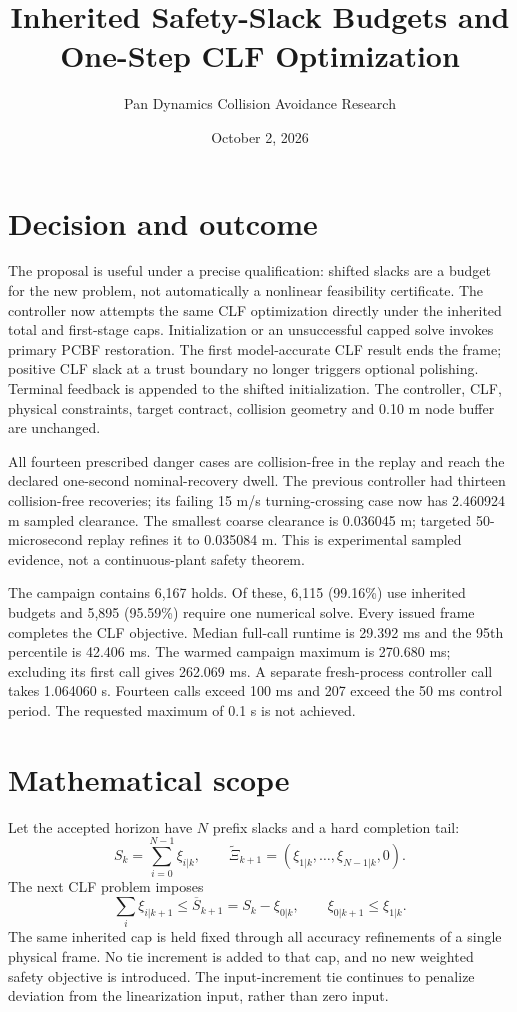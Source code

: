 \documentclass[11pt]{article}
\title{Inherited Safety-Slack Budgets and One-Step CLF Optimization}
\author{Pan Dynamics Collision Avoidance Research}
\date{October 2, 2026}
\begin{document}
\maketitle
\section{Decision and outcome}
The proposal is useful under a precise qualification: shifted slacks are a
budget for the new problem, not automatically a nonlinear feasibility
certificate. The controller now attempts the same CLF optimization directly
under the inherited total and first-stage caps. Initialization or an
unsuccessful capped solve invokes primary PCBF restoration. The first
model-accurate CLF result ends the frame; positive CLF slack at a trust boundary
no longer triggers optional polishing. Terminal feedback is appended to the
shifted initialization. The controller, CLF, physical constraints, target
contract, collision geometry and 0.10 m node buffer are unchanged.

All fourteen prescribed danger cases are collision-free in the replay and
reach the declared one-second nominal-recovery dwell. The previous controller
had thirteen collision-free recoveries; its failing 15 m/s turning-crossing
case now has 2.460924 m sampled clearance. The smallest coarse clearance is
0.036045 m; targeted 50-microsecond replay refines it to 0.035084 m. This is
experimental sampled evidence, not a continuous-plant safety theorem.

The campaign contains 6,167 holds. Of these, 6,115 (99.16\%) use inherited
budgets and 5,895 (95.59\%) require one numerical solve. Every issued frame
completes the CLF objective. Median full-call runtime is 29.392 ms and the
95th percentile is 42.406 ms. The warmed campaign maximum is 270.680 ms;
excluding its first call gives 262.069 ms. A separate fresh-process controller
call takes 1.064060 s. Fourteen calls exceed 100 ms and 207 exceed the 50 ms
control period. The requested maximum of 0.1 s is not achieved.

\section{Mathematical scope}
Let the accepted horizon have $N$ prefix slacks and a hard completion tail:
\[
 S_k=\sum_{i=0}^{N-1}\xi_{i|k},\qquad
 \widetilde\Xi_{k+1}=(\xi_{1|k},\ldots,\xi_{N-1|k},0).
\]
The next CLF problem imposes
\[
 \sum_i\xi_{i|k+1}\le\overline S_{k+1}=S_k-\xi_{0|k},\qquad
 \xi_{0|k+1}\le\xi_{1|k}.
\]
The same inherited cap is held fixed through all accuracy refinements of a
single physical frame. No tie increment is added to that cap, and no new
weighted safety objective is introduced. The input-increment tie continues
to penalize deviation from the linearization input, rather than zero input.
\end{document}
